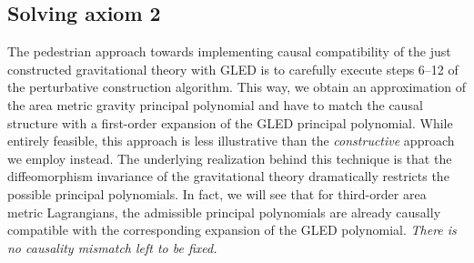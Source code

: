 \subsection{Solving axiom 2}
The pedestrian approach towards implementing causal compatibility of the just constructed gravitational theory with GLED is to carefully execute steps 6--12 of the perturbative construction algorithm. This way, we obtain an approximation of the area metric gravity principal polynomial and have to match the causal structure with a first-order expansion of the GLED principal polynomial. While entirely feasible, this approach is less illustrative than the \emph{constructive} approach we employ instead. The underlying realization behind this technique is that the diffeomorphism invariance of the gravitational theory dramatically restricts the possible principal polynomials. In fact, we will see that for third-order area metric Lagrangians, the admissible principal polynomials are already causally compatible with the corresponding expansion of the GLED polynomial. \emph{There is no causality mismatch left to be fixed.}

